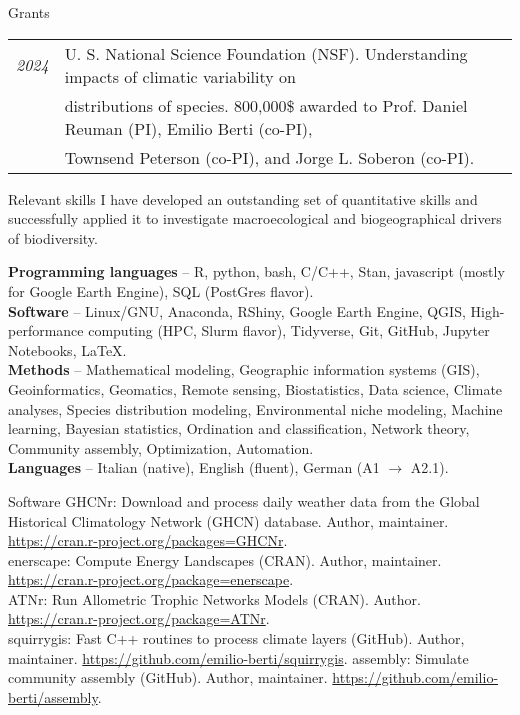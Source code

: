 \documentclass{resume} %
\begin{document}
\begin{rSection}{Grants}
\begin{tabular}{l l}
{\em 2024} & U. S. National Science Foundation (NSF). Understanding impacts of climatic variability on\\
           & distributions of species. 800,000\$ awarded to Prof. Daniel Reuman (PI), Emilio Berti (co-PI),\\
           & Townsend Peterson (co-PI), and Jorge L. Soberon (co-PI).
\end{tabular}
\end{rSection}

\begin{rSection}{Relevant skills}
I have developed an outstanding set of quantitative skills and successfully applied it to investigate macroecological and biogeographical drivers of biodiversity.

\textbf{Programming languages} – R, python, bash, C/C++, Stan, javascript (mostly for Google Earth Engine), SQL (PostGres flavor).\\
\textbf{Software} – Linux/GNU, Anaconda, RShiny, Google Earth Engine, QGIS, High-performance computing (HPC, Slurm flavor), Tidyverse, Git, GitHub, Jupyter Notebooks, \LaTeX.\\
\textbf{Methods} – Mathematical modeling, Geographic information systems (GIS), Geoinformatics, Geomatics, Remote sensing, Biostatistics, Data science, Climate analyses, Species distribution modeling, Environmental niche modeling, Machine learning, Bayesian statistics, Ordination and classification, Network theory,
Community assembly, Optimization, Automation.\\
\textbf{Languages} – Italian (native), English (fluent), German (A1 $\rightarrow$ A2.1).
\end{rSection}

\begin{rSection}{Software}
GHCNr: Download and process daily weather data from the Global Historical Climatology Network (GHCN) database. Author, maintainer. \url{https://cran.r-project.org/packages=GHCNr}.\\
enerscape: Compute Energy Landscapes (CRAN). Author, maintainer. \url{https://cran.r-project.org/package=enerscape}.\\
ATNr: Run Allometric Trophic Networks Models (CRAN). Author. \url{https://cran.r-project.org/package=ATNr}.\\
squirrygis: Fast C++ routines to process climate layers (GitHub). Author, maintainer. \url{https://github.com/emilio-berti/squirrygis}.
assembly: Simulate community assembly (GitHub). Author, maintainer. \url{https://github.com/emilio-berti/assembly}.
\end{rSection}
\end{document}
